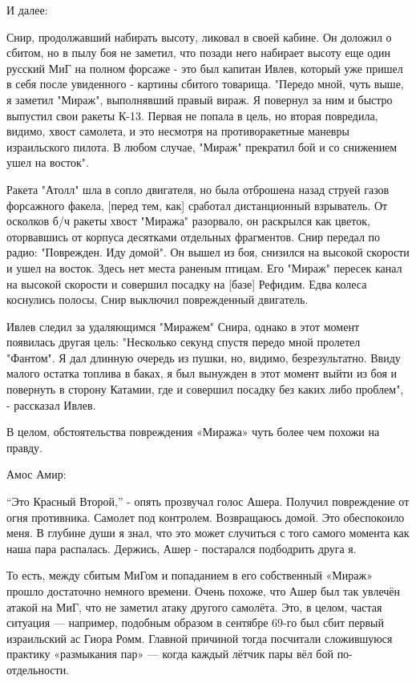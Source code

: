 И далее:

\begin{textcitation}
	Снир, продолжавший набирать высоту, ликовал в своей кабине. Он доложил о сбитом, но в пылу боя не заметил, что позади него набирает высоту еще один русский МиГ на полном форсаже - это был капитан Ивлев, который уже пришел в себя после увиденного - картины сбитого товарища. "Передо мной, чуть выше, я заметил "Мираж", выполнявший правый вираж. Я повернул за ним и быстро выпустил свои ракеты К-13. Первая не попала в цель, но вторая повредила, видимо, хвост самолета, и это несмотря на противоракетные маневры израильского пилота. В любом случае, "Мираж" прекратил бой и со снижением ушел на восток".
	
	Ракета "Атолл" шла в сопло двигателя, но была отброшена назад струей газов форсажного факела, [перед тем, как] сработал дистанционный взрыватель. От осколков б/ч ракеты хвост "Миража" разорвало, он раскрылся как цветок, оторвавшись от корпуса десятками отдельных фрагментов. Снир передал по радио: "Поврежден. Иду домой". Он вышел из боя, снизился на высокой скорости и ушел на восток. Здесь нет места раненым птицам. Его "Мираж" пересек канал на высокой скорости и совершил посадку на [базе] Рефидим. Едва колеса коснулись полосы, Снир выключил поврежденный двигатель.
	
	Ивлев следил за удаляющимся "Миражем" Снира, однако в этот момент появилась другая цель: "Несколько секунд спустя передо мной пролетел "Фантом". Я дал длинную очередь из пушки, но, видимо, безрезультатно. Ввиду малого остатка топлива в баках, я был вынужден в этот момент выйти из боя и повернуть в сторону Катамии, где и совершил посадку без каких либо проблем", - рассказал Ивлев.
\end{textcitation}

В целом, обстоятельства повреждения «Миража» чуть более чем похожи на правду.

Амос Амир:

\begin{textcitation}
	“Это Красный Второй,” - опять прозвучал голос Ашера. Получил повреждение от огня противника. Самолет под контролем. Возвращаюсь домой. Это обеспокоило меня. В глубине души я знал, что это может случиться с того самого момента как наша пара распалась. Держись, Ашер - постарался подбодрить друга я.
\end{textcitation}

То есть, между сбитым МиГом и попаданием в его собственный «Мираж» прошло достаточно немного времени. Очень похоже, что Ашер был так увлечён атакой на МиГ, что не заметил атаку другого самолёта. Это, в целом, частая ситуация — например, подобным образом в сентябре 69-го был сбит первый израильский ас Гиора Ромм. Главной причиной тогда посчитали сложившуюся практику «размыкания пар» — когда каждый лётчик пары вёл бой по-отдельности.

